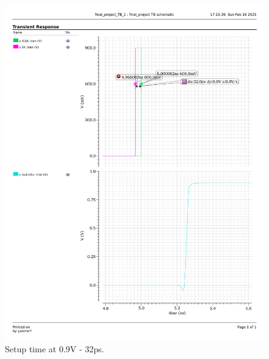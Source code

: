 \documentclass[a4paper,12pt]{article}
\begin{document}
\begin{figure}[H]
\begin{minipage}{0.49\textwidth}
        \includegraphics[width=\textwidth]{graphs/setup_0.9_32p.pdf}
        \caption{Setup time at 0.9V - 32ps.}
    \end{minipage}
\end{figure}
\end{document}
